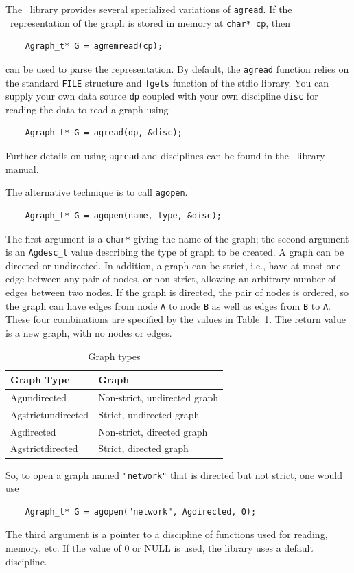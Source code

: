 The \gviz\ library provides several specialized variations of {\tt agread}. If
the \DOT\ representation of the graph is stored in memory at {\tt char* cp}, then
\begin{verbatim}
    Agraph_t* G = agmemread(cp);
\end{verbatim}
can be used to parse the representation. By default, the {\tt agread} function relies on the
standard {\tt FILE} structure and {\tt fgets} function of the stdio library. You
can supply your own data source {\tt dp} coupled with your own discipline {\tt disc} 
for reading the data to read a graph using
\begin{verbatim}
    Agraph_t* G = agread(dp, &disc);
\end{verbatim}
Further details on using {\tt agread} and disciplines can be found in the \graph\ library manual.

The alternative technique is to call {\tt agopen}. 
\begin{verbatim}
    Agraph_t* G = agopen(name, type, &disc);
\end{verbatim}
The first argument is a {\tt char*} giving the name of the graph; 
the second argument is an {\tt Agdesc\_t} value describing the type of graph
to be created. A graph can be directed or undirected. In
addition, a graph can be strict, i.e., have at most one edge between
any pair of nodes, or non-strict, allowing an arbitrary number of edges
between two nodes. If the graph is directed, the pair of nodes is ordered,
so the graph can have edges from node {\tt A} to node {\tt B} as well
as edges from {\tt B} to {\tt A}. These four combinations are specified
by the values in Table~\ref{table:types}.
The return value is a new graph, with no nodes or edges.
\begin{table}[h]
\centering
\begin{tabular}{|l|l|} \hline
Graph Type & Graph \\ \hline
Agundirected & Non-strict, undirected graph \\
Agstrictundirected & Strict, undirected graph \\
Agdirected & Non-strict, directed graph \\
Agstrictdirected & Strict, directed graph \\ \hline
\end{tabular}
\caption{Graph types}
\label{table:types}
\end{table}
So, to open a graph named {\tt "network"} that is directed but not strict, one would use
\begin{verbatim}
    Agraph_t* G = agopen("network", Agdirected, 0);
\end{verbatim}
The third argument is a pointer to a discipline of functions used for reading, memory, etc.
If the value of 0 or NULL is used, the library uses a default discipline.

